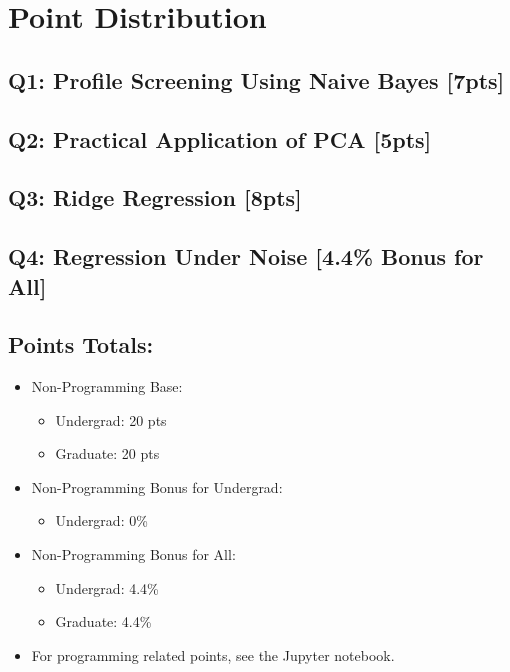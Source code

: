 \section*{Point Distribution}
\subsection*{Q1: Profile Screening Using Naive Bayes [7pts]}
\subsection*{Q2: Practical Application of PCA [5pts]}
\subsection*{Q3: Ridge Regression [8pts]}
\subsection*{Q4: Regression Under Noise [4.4\% Bonus for All]}

\bigskip
\subsection*{Points Totals:}
\begin{itemize}
    \item Non-Programming Base:\begin{itemize}
        \itemsep0em
        \item Undergrad: 20 pts
        \item Graduate: 20 pts
    \end{itemize}
    \item Non-Programming Bonus for Undergrad:\begin{itemize}
        \itemsep0em
        \item Undergrad: 0\%
    \end{itemize}
    \item Non-Programming Bonus for All:\begin{itemize}
        \itemsep0em
        \item Undergrad: 4.4\%
        \item Graduate: 4.4\%
    \end{itemize}
    \item For programming related points, see the Jupyter notebook.
\end{itemize}